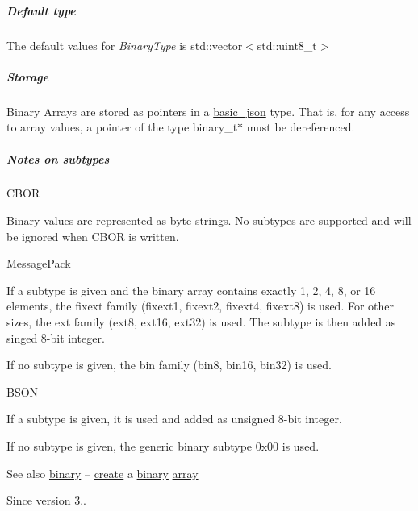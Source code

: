 \subparagraph*{Default type}

The default values for {\itshape Binary\+Type} is {\ttfamily std\+::vector$<$std\+::uint8\+\_\+t$>$}

\subparagraph*{Storage}

Binary Arrays are stored as pointers in a \hyperlink{classnlohmann_1_1basic__json}{basic\+\_\+json} type. That is, for any access to array values, a pointer of the type {\ttfamily binary\+\_\+t$\ast$} must be dereferenced.

\subparagraph*{Notes on subtypes}


\begin{DoxyItemize}
\item C\+B\+OR
\begin{DoxyItemize}
\item Binary values are represented as byte strings. No subtypes are supported and will be ignored when C\+B\+OR is written.
\end{DoxyItemize}
\item Message\+Pack
\begin{DoxyItemize}
\item If a subtype is given and the binary array contains exactly 1, 2, 4, 8, or 16 elements, the fixext family (fixext1, fixext2, fixext4, fixext8) is used. For other sizes, the ext family (ext8, ext16, ext32) is used. The subtype is then added as singed 8-\/bit integer.
\item If no subtype is given, the bin family (bin8, bin16, bin32) is used.
\end{DoxyItemize}
\item B\+S\+ON
\begin{DoxyItemize}
\item If a subtype is given, it is used and added as unsigned 8-\/bit integer.
\item If no subtype is given, the generic binary subtype 0x00 is used.
\end{DoxyItemize}
\end{DoxyItemize}

\begin{DoxySeeAlso}{See also}
\hyperlink{classnlohmann_1_1basic__json_a9a4a1bb634091c7ebd66c4e989ed469d}{binary} -- \hyperlink{classnlohmann_1_1basic__json_a49cba7a0d3a355161e2b62b437b80936}{create} a \hyperlink{classnlohmann_1_1basic__json_a9a4a1bb634091c7ebd66c4e989ed469d}{binary} \hyperlink{classnlohmann_1_1basic__json_ad2b075c694e4564c9742d2c8db7c7c5f}{array}
\end{DoxySeeAlso}
\begin{DoxySince}{Since}
version 3.. 
\end{DoxySince}
